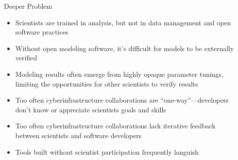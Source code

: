 \documentclass[final]{beamer}
\newlength{\onecolwid}
\newlength{\twocolwid}
\begin{document}
\begin{frame}[t]
\begin{columns}[t]
\begin{column}{\twocolwid}

\begin{columns}[t,totalwidth=\twocolwid] %

\begin{column}{\onecolwid}\vspace{-.6in} %



\begin{block}{Deeper Problem}
    \begin{itemize}
        \item Scientists are trained in analysis, but not in data management and open software practices
        \item Without open modeling software, it's difficult for models to be externally verified
        \item Modeling results often emerge from highly opaque parameter tunings, limiting the opportunities
            for other scientists to verify results
        \item Too often cyberinfrastructure collaborations are ``one-way''---developers don't know or appreciate
            scientists goals and skills
        \item Too often cyberinfrastructure collaborations lack iterative feedback between scientists and
            software developers
        \item Tools built without scientist participation frequently languish
    \end{itemize}

\end{block}


\end{column} %

\begin{column}{\onecolwid}\vspace{-.6in} %




\end{column}
\end{columns}
\end{column}
\end{columns}
\end{frame}
\end{document}
